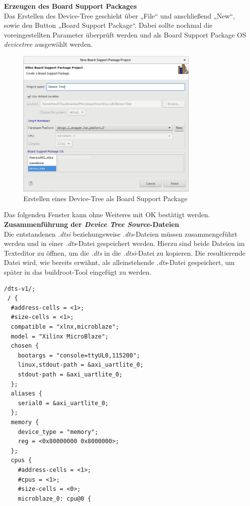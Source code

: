 \textbf{Erzeugen des Board Support Packages}\\

Das Erstellen des Device-Tree geschieht über „File“ und anschließend „New“, sowie den Button „Board Support Package“.
Dabei sollte nochmal die voreingestellten Parameter überprüft werden und als Board Support Package OS
\emph{devicetree} ausgewählt werden.

\begin{figure}[H]
\centering
\includegraphics[width=0.8\textwidth]{Hauptteil/Schritt14.png}
\caption{Erstellen eines Device-Tree als Board Support Package}\label{fig:mbschritt14}
\end{figure}

Das folgenden Fenster kann ohne Weiteres mit OK bestätigt werden.\\


\textbf{Zusammenführung der \emph{Device Tree Source}-Dateien}\\

Die entstandenen \emph{.dtsi} beziehungsweise \emph{.dts}-Dateien müssen zusammengeführt werden und in einer \emph{.dts}-Datei gespeichert werden.
Hierzu sind beide Dateien im Texteditor zu öffnen, um die \emph{.dts}
 in die \emph{.dtsi}-Datei zu kopieren.
 Die resultierende Datei wird, wie bereits erwähnt, als alleinstehende \emph{.dts}-Datei gespeichert, um später in das buildroot-Tool eingefügt zu werden.\\

 \begin{lstlisting}[caption={Artix7.dts-Datei},label={code:artixdts}]
 /dts-v1/;
 / {
  #address-cells = <1>;
  #size-cells = <1>;
  compatible = "xlnx,microblaze";
  model = "Xilinx MicroBlaze";
  chosen {
    bootargs = "console=ttyUL0,115200";
    linux,stdout-path = &axi_uartlite_0;
    stdout-path = &axi_uartlite_0;
  };
  aliases {
    serial0 = &axi_uartlite_0;
  };
  memory {
    device_type = "memory";
    reg = <0x80000000 0x8000000>;
  };
  cpus {
    #address-cells = <1>;
    #cpus = <1>;
    #size-cells = <0>;
    microblaze_0: cpu@0 {
  \end{lstlisting}


